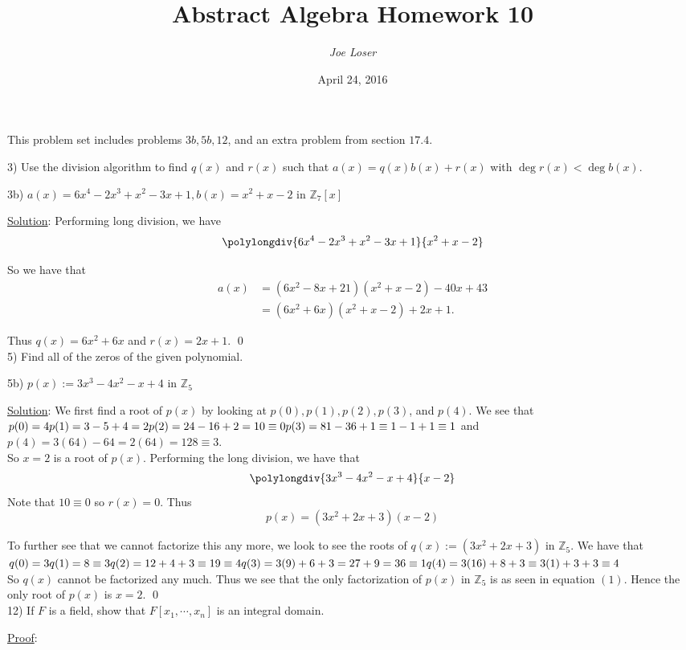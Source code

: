 \documentclass{article}
\title{Abstract Algebra Homework 10}
\author{\textit{Joe Loser}}
\date{April 24, 2016}
\begin{document}
\maketitle

This problem set includes problems $3b, 5b, 12$, and an extra problem from section $17.4$.

3) Use the division algorithm to find $q(x)$ and $r(x)$ such that $a(x) = q(x)b(x) + r(x)$ with $\deg r(x) < \deg b(x)$.

3b) $a(x) = 6x^4-2x^3+x^2-3x+1, b(x) = x^2 + x - 2$ in $\mathbb{Z}_7[x]$

\underline{Solution}: Performing long division, we have  $$\polylongdiv{6x^4-2x^3+x^2-3x+1}{x^2+x-2}$$

So we have that
\begin{align*}
	a(x) &= (6x^2-8x+21)(x^2+x-2) - 40x + 43 \\
	&= (6x^2+6x)(x^2+x-2) + 2x + 1.
\end{align*}

Thus $q(x) = 6x^2 + 6x$ and $r(x) = 2x + 1$. \qed \\

5) Find all of the zeros of the given polynomial.

5b) $p(x) := 3x^3-4x^2-x+4$ in $\mathbb{Z}_5$

\underline{Solution}: We first find a root of $p(x)$ by looking at $p(0), p(1), p(2), p(3)$, and $p(4)$. We see that
$\\p(0) = 4 \\
p(1) = 3 - 5 + 4 = 2 \\
p(2) = 24 - 16 + 2 = 10 \equiv 0 \\
p(3) = 81-36+1 \equiv 1-1+1 \equiv 1$ and \\
$p(4) = 3(64)-64 = 2(64) = 128 \equiv 3$. \\

So $x = 2$ is a root of $p(x)$. Performing the long division, we have that
$$ \polylongdiv{3x^3-4x^2-x+4}{x-2} $$
Note that $10 \equiv 0$ so $r(x) = 0$. Thus 
\begin{equation}
	p(x) = (3x^2+2x+3)(x-2)
\end{equation}

To further see that we cannot factorize this any more, we look to see the roots of $q(x) := (3x^2+2x+3)$ in $\mathbb{Z}_5$. We have that 
$\\q(0) = 3 \\
q(1) = 8 \equiv 3 \\
q(2) = 12 + 4 + 3 \equiv 19 \equiv 4 \\
q(3) = 3(9) + 6 + 3 = 27 + 9 = 36 \equiv 1 \\
q(4) = 3(16) + 8 + 3 \equiv 3(1) + 3 + 3 \equiv 4$ \\

So $q(x)$ cannot be factorized any much. Thus we see that the only factorization of $p(x)$ in $\mathbb{Z}_5$ is as seen in equation $(1)$. Hence the only root of $p(x)$ is $x = 2$. \qed \\

12) If $F$ is a field, show that $F[x_1, \cdots, x_n]$ is an integral domain.

\underline{Proof}: 
\end{document}
